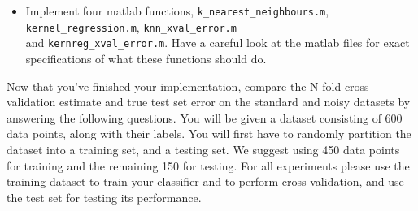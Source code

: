 \documentclass[english]{article}
\begin{document}
\begin{itemize}
\item Implement four matlab functions,  {\tt k\_nearest\_neighbours.m},  {\tt kernel\_regression.m}, 
{\tt knn\_xval\_error.m} \\
and {\tt kernreg\_xval\_error.m}. 
Have a careful look at the matlab files for exact specifications of what these functions should do.

\end{itemize}
Now that you've finished your implementation, compare the N-fold
cross-validation estimate and true test set error on the standard and
noisy datasets by answering the following questions. You will be given a dataset consisting of 600 data points, along with their labels. You will first have to randomly partition the dataset into a training set, and a testing set. We suggest using 450 data points for training and the remaining 150 for testing. For all experiments please use the training dataset to train your classifier and to perform cross validation, and use the test set for testing its performance.
\end{document}
